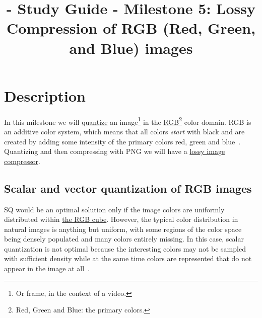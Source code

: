 

\title{\SM{} - Study Guide - Milestone 5: Lossy Compression of RGB (Red, Green, and Blue) images}

\maketitle

\tableofcontents

\section{Description}

In this milestone we will
\href{https://vicente-gonzalez-ruiz.github.io/quantization/}{quantize}
an image\footnote{Or frame, in the context of a video.} in the
\href{https://en.wikipedia.org/wiki/RGB_color_model}{RGB\footnote{Red,
  Green and Blue: the primary colors.} color domain}. RGB is an
additive color system, which means that all colors \emph{start} with
black and are created by adding some intensity of the primary colors
red, green and blue~\cite{burger2016digital}. Quantizing and then
compressing with PNG we will have a
\href{https://en.wikipedia.org/wiki/Lossy_compression}{lossy image
  compressor}.


\subsection{Scalar and vector quantization of RGB images}

SQ would be an optimal solution only if the image colors are uniformly
distributed within
\href{https://en.wikipedia.org/wiki/RGB_color_model}{the RGB
  cube}. However, the typical color distribution in natural images is
anything but uniform, with some regions of the color space being
densely populated and many colors entirely missing. In this case,
scalar quantization is not optimal because the interesting colors may
not be sampled with suﬃcient density while at the same time colors are
represented that do not appear in the image at
all~\cite{burger2016digital}.

